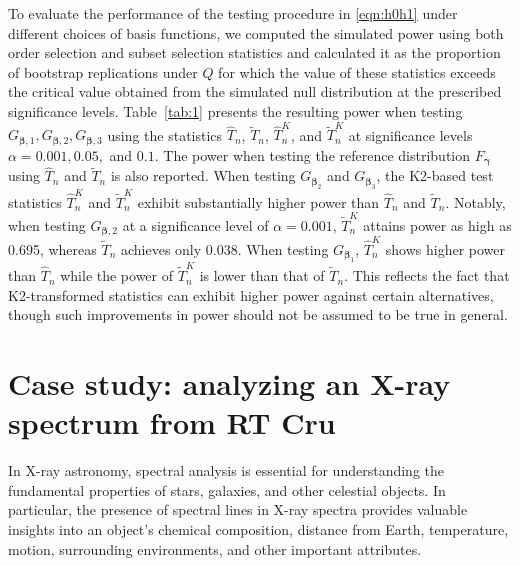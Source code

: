 \documentclass[11pt]{article}
\newcommand{\vect}[1]{\boldsymbol{#1}}
\begin{document}
To evaluate the performance of the testing procedure in \eqref{eqn:h0h1} under different choices of basis functions, we computed the simulated power using both order selection and subset selection statistics and calculated it as the proportion of bootstrap replications under $Q$ for which the value of these statistics  exceeds the critical value obtained from the simulated null distribution at the prescribed significance levels. 
Table~\ref{tab:1} presents the resulting power when testing $G_{\vect{\beta},1}, G_{\vect{\beta},2}, G_{\vect{\beta},3}$ using the statistics $\widehat{T}_n$, $\widetilde{T}_n$, $\widehat{T}^{K}_n$, and $\widetilde{T}^{K}_n$  at significance levels $\alpha=0.001, 0.05,$ and $0.1$. The power when testing the reference distribution $F_{\vect{\gamma}}$ using $\widehat{T}_n$ and $\widetilde{T}_n$ is also reported. When testing $G_{\vect{\beta}_2}$ and $G_{\vect{\beta}_3}$, the K2-based test statistics $\widehat{T}^{K}_n$ and $\widetilde{T}^{K}_n$ exhibit substantially higher power than $\widehat{T}_n$ and $\widetilde{T}_n$. Notably, when testing $G_{\vect{\beta},2}$ at a significance level of $\alpha=0.001$, $\widetilde{T}_n^{K}$ attains power as high as 0.695, whereas $\widetilde{T}_n$ achieves only 0.038. When testing $G_{\vect{\beta}_1}$, $\widehat{T}^{K}_n$ shows higher power than $\widehat{T}_n$ while the power of $\widetilde{T}^{K}_n$ is  lower than that of $\widetilde{T}_n$. This reflects the fact that K2-transformed statistics can exhibit higher power against certain alternatives, though such improvements in power should not be assumed to be true in general.  %


\section{Case study: analyzing an X-ray spectrum from RT Cru}  \label{sec:5}
In X-ray astronomy, spectral analysis is essential for understanding the fundamental properties of stars, galaxies, and other celestial objects. In particular, the presence of spectral lines in X-ray spectra provides valuable insights into an object’s chemical composition, distance from Earth, temperature, motion, surrounding environments, and other important attributes.
\end{document}
